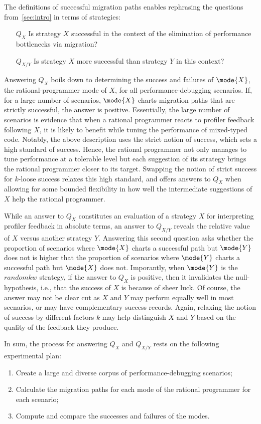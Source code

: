 
The definitions of successful migration paths enables rephrasing the
questions from~\ref{sec:intro} in terms of strategies:
\begin{itemize}
\item[$Q_X$] Is strategy $X$ successful in the context of the elimination of
  performance bottlenecks via migration?

\item[$Q_{X/Y}$] Is strategy $X$ more successful than strategy $Y$ in this
  context?
\end{itemize}

Answering $Q_X$ boils down to determining the success and failures of
$\mode{X}$, the rational-programmer mode of $X$, for all
performance-debugging scenarios. If, for a large number of scenarios,
$\mode{X}$ charts migration paths that are strictly successful, the answer
is positive. Essentially, the large number of scenarios is evidence that
when a rational programmer reacts to profiler feedback following $X$, it is
likely to benefit  while tuning the performance of 
mixed-typed code. Notably, the above description uses the strict notion of
success, which sets a high standard of success. Hence, the rational
programmer not only manages to tune performance at a tolerable level but
each suggestion of its strategy brings the rational programmer closer to
its target. Swapping the notion of strict success for $k$-loose success
relaxes this high standard, and offers answers to $Q_X$ when allowing for
some bounded flexibility in how well the intermediate suggestions of
$X$ help the rational programmer.   

While an answer to $Q_X$ constitutes an evaluation of a strategy $X$ for interpreting
profiler feedback in absolute terms, an answer to $Q_{X/Y}$ reveals the
relative value of $X$ versus another strategy $Y$. Answering this second
question asks whether the proportion of scenarios where $\mode{X}$ charts a
successful path but  $\mode{Y}$ does not is higher that the proportion of
scenarios where  $\mode{Y}$ charts a successful path but $\mode{X}$ does not.
 Imporantly, when $\mode{Y}$ is the $randomkw{}$ strategy, if
the answer to $Q_X$ is positive, then it invalidates the null-hypothesis,
i.e., that the success of $X$ is because of sheer luck.
Of course, the answer may not be clear cut as $X$ and $Y$ may
perform equally well in most scenarios, or may have complementary success 
records. Again, relaxing the notion of success by different factors $k$
may help distinguish  $X$ and $Y$ based on the quality of the feedback
they produce.


In sum, the process for answering $Q_X$ and $Q_{X/Y}$ rests on the
following experimental plan:
\begin{enumerate}
\item Create a large and diverse corpus of performance-debugging scenarios;
\item Calculate the migration paths for each mode of the rational
  programmer for each scenario;
\item Compute and compare the successes and failures of the modes.  
\end{enumerate}


